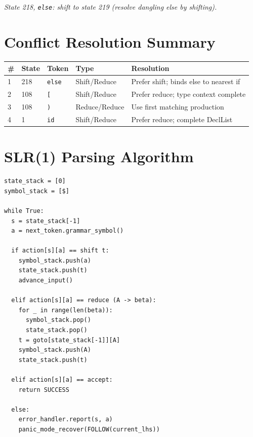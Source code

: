\documentclass[12pt,a4paper]{article}
\begin{document}
\textit{State 218, \texttt{else}: shift to state 219 (resolve dangling else by shifting).}

\section{Conflict Resolution Summary}

\begin{center}
\begin{tabular}{llllp{5cm}}
\toprule
\# & State & Token & Type & Resolution \\
\midrule
1 & 218 & \texttt{else} & Shift/Reduce & Prefer shift; binds else to nearest if \\
2 & 108 & \texttt{[}    & Shift/Reduce & Prefer reduce; type context complete \\
3 & 108 & \texttt{)}    & Reduce/Reduce & Use first matching production \\
4 & 1   & \texttt{id}   & Shift/Reduce & Prefer reduce; complete DeclList \\
\bottomrule
\end{tabular}
\end{center}

\section{SLR(1) Parsing Algorithm}

\begin{lstlisting}[style=pseudo]
state_stack = [0]
symbol_stack = [$]

while True:
  s = state_stack[-1]
  a = next_token.grammar_symbol()

  if action[s][a] == shift t:
    symbol_stack.push(a)
    state_stack.push(t)
    advance_input()

  elif action[s][a] == reduce (A -> beta):
    for _ in range(len(beta)):
      symbol_stack.pop()
      state_stack.pop()
    t = goto[state_stack[-1]][A]
    symbol_stack.push(A)
    state_stack.push(t)

  elif action[s][a] == accept:
    return SUCCESS

  else:
    error_handler.report(s, a)
    panic_mode_recover(FOLLOW(current_lhs))
\end{lstlisting}
\end{document}
